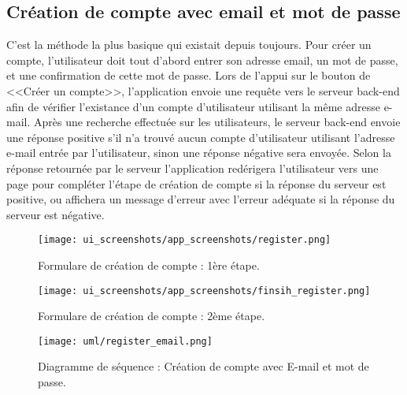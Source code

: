 \subsection{Création de compte avec email et mot de passe}
C'est la méthode la plus basique qui existait depuis toujours. Pour créer un compte, l'utilisateur doit tout d'abord entrer son adresse email, un mot de passe, et une confirmation de cette mot de passe. Lors de l'appui sur le bouton de <<Créer un compte>>, l'application envoie une requête vers le serveur back-end afin de vérifier l'existance d'un compte d'utilisateur utilisant la même adresse e-mail. Après une recherche effectuée sur les utilisateurs, le serveur back-end envoie une réponse positive s'il n'a trouvé aucun compte d'utilisateur utilisant l'adresse e-mail entrée par l'utilisateur, sinon une réponse négative sera envoyée. Selon la réponse retournée par le serveur l'application redérigera l'utilisateur vers une page pour compléter l'étape de création de compte si la réponse du serveur est positive, ou affichera un message d'erreur avec l'erreur adéquate si la réponse du serveur est négative.
\clearpage
\begin{multicols}{2}
    \begin{figure}[H]
        \begin{center}
            \centering
            \texttt{[image: ui\_screenshots/app\_screenshots/register.png]}
            \captionsetup{justification=centering}
            \caption{Formulare de création de compte : 1ère étape.}
            \label{fig:app_register}
        \end{center}
    \end{figure}
    \begin{figure}[H]
        \begin{center}
            \centering
            \texttt{[image: ui\_screenshots/app\_screenshots/finsih\_register.png]}
            \captionsetup{justification=centering}
            \caption{Formulare de création de compte : 2ème étape.}
            \label{fig:app_finish_register}
        \end{center}
    \end{figure}
\end{multicols}
\begin{figure}[H]
    \centering
    \texttt{[image: uml/register\_email.png]}
    \vspace{.5cm}
    \caption{Diagramme de séquence : Création de compte avec E-mail et mot de passe.}
    \label{fig:seq_register_email}
\end{figure}

